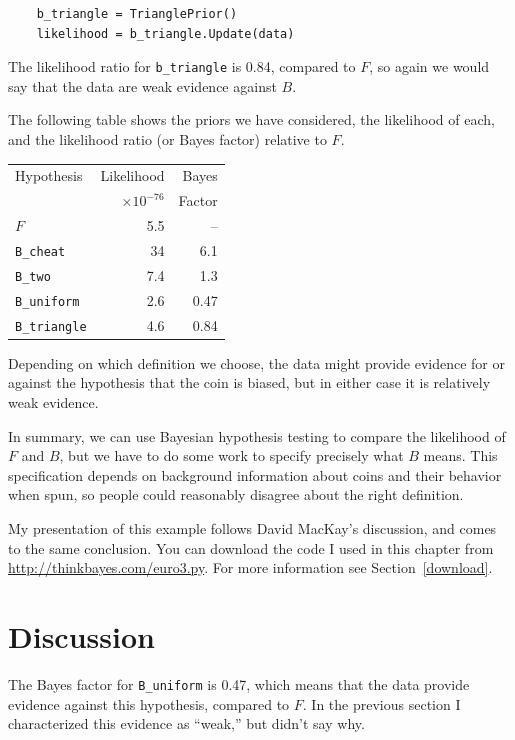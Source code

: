 \documentclass[12pt]{book}
\begin{document}
\begin{verbatim}
    b_triangle = TrianglePrior()
    likelihood = b_triangle.Update(data)
\end{verbatim}

The likelihood ratio for \verb"b_triangle" is 0.84, compared to $F$, so
again we would say that the data are weak evidence against $B$.

The following table shows the priors we have considered, the
likelihood of each, and the likelihood ratio (or Bayes factor)
relative to $F$.

\begin{tabular}{|l|r|r|}
\hline
Hypothesis   & Likelihood & Bayes  \\
             & $\times 10^{-76}$ & Factor  \\
\hline
$F$              & 5.5   & --   \\
\verb"B_cheat"  & 34   &  6.1   \\
\verb"B_two"     & 7.4   &  1.3   \\
\verb"B_uniform"  & 2.6   &  0.47   \\
\verb"B_triangle"  & 4.6   &  0.84   \\
\hline
\end{tabular}

Depending on which definition we choose, the data might provide
evidence for or against the hypothesis that the coin is biased, but
in either case it is relatively weak evidence.

In summary, we can use Bayesian hypothesis testing to compare the
likelihood of $F$ and $B$, but we have to do some work to specify
precisely what $B$ means.  This specification depends on background
information about coins and their behavior when spun, so people
could reasonably disagree about the right definition.

My presentation of this example follows
David MacKay's discussion, and comes to the same conclusion.
You can download the code I used in this chapter from
\url{http://thinkbayes.com/euro3.py}.
  For more information
see Section~\ref{download}.

\section{Discussion}

The Bayes factor for \verb"B_uniform" is 0.47, which means
that the data provide evidence against this hypothesis, compared
to $F$.  In the previous section I characterized this evidence
as ``weak,'' but didn't say why.
\end{document}
